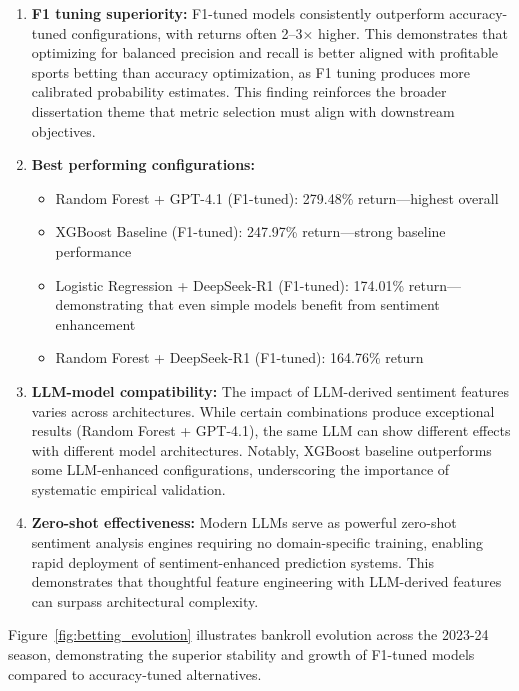 \begin{enumerate}[leftmargin=*]
    \item \textbf{F1 tuning superiority:} F1-tuned models consistently outperform accuracy-tuned configurations, with returns often 2--3$\times$ higher. This demonstrates that optimizing for balanced precision and recall is better aligned with profitable sports betting than accuracy optimization, as F1 tuning produces more calibrated probability estimates. This finding reinforces the broader dissertation theme that metric selection must align with downstream objectives.
    
    \item \textbf{Best performing configurations:}
    \begin{itemize}
        \item Random Forest + GPT-4.1 (F1-tuned): 279.48\% return---highest overall
        \item XGBoost Baseline (F1-tuned): 247.97\% return---strong baseline performance
        \item Logistic Regression + DeepSeek-R1 (F1-tuned): 174.01\% return---demonstrating that even simple models benefit from sentiment enhancement
        \item Random Forest + DeepSeek-R1 (F1-tuned): 164.76\% return
    \end{itemize}
    
    \item \textbf{LLM-model compatibility:} The impact of LLM-derived sentiment features varies across architectures. While certain combinations produce exceptional results (Random Forest + GPT-4.1), the same LLM can show different effects with different model architectures. Notably, XGBoost baseline outperforms some LLM-enhanced configurations, underscoring the importance of systematic empirical validation.
    
    \item \textbf{Zero-shot effectiveness:} Modern LLMs serve as powerful zero-shot sentiment analysis engines requiring no domain-specific training, enabling rapid deployment of sentiment-enhanced prediction systems. This demonstrates that thoughtful feature engineering with LLM-derived features can surpass architectural complexity.
\end{enumerate}

Figure~\ref{fig:betting_evolution} illustrates bankroll evolution across the 2023-24 season, demonstrating the superior stability and growth of F1-tuned models compared to accuracy-tuned alternatives.

